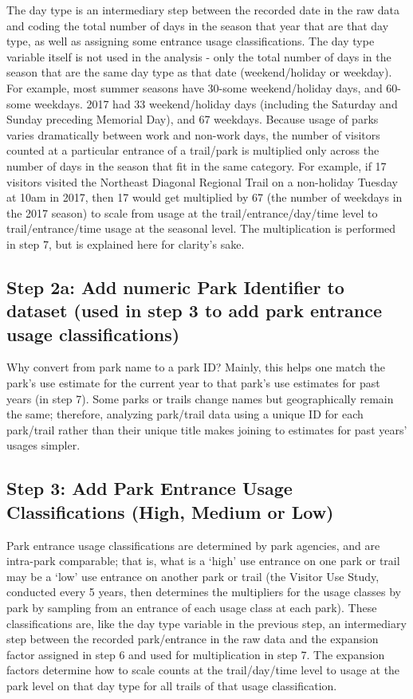 \documentclass[]{article}
\begin{document}
The day type is an intermediary step between the recorded date in the
raw data and coding the total number of days in the season that year
that are that day type, as well as assigning some entrance usage
classifications. The day type variable itself is not used in the
analysis - only the total number of days in the season that are the same
day type as that date (weekend/holiday or weekday). For example, most
summer seasons have 30-some weekend/holiday days, and 60-some weekdays.
2017 had 33 weekend/holiday days (including the Saturday and Sunday
preceding Memorial Day), and 67 weekdays. Because usage of parks varies
dramatically between work and non-work days, the number of visitors
counted at a particular entrance of a trail/park is multiplied only
across the number of days in the season that fit in the same category.
For example, if 17 visitors visited the Northeast Diagonal Regional
Trail on a non-holiday Tuesday at 10am in 2017, then 17 would get
multiplied by 67 (the number of weekdays in the 2017 season) to scale
from usage at the trail/entrance/day/time level to trail/entrance/time
usage at the seasonal level. The multiplication is performed in step 7,
but is explained here for clarity's sake.

\subsection{Step 2a: Add numeric Park Identifier to dataset (used in
step 3 to add park entrance usage
classifications)}\label{step-2a-add-numeric-park-identifier-to-dataset-used-in-step-3-to-add-park-entrance-usage-classifications}

Why convert from park name to a park ID? Mainly, this helps one match
the park's use estimate for the current year to that park's use
estimates for past years (in step 7). Some parks or trails change names
but geographically remain the same; therefore, analyzing park/trail data
using a unique ID for each park/trail rather than their unique title
makes joining to estimates for past years' usages simpler.

\subsection{Step 3: Add Park Entrance Usage Classifications (High,
Medium or
Low)}\label{step-3-add-park-entrance-usage-classifications-high-medium-or-low}

Park entrance usage classifications are determined by park agencies, and
are intra-park comparable; that is, what is a `high' use entrance on one
park or trail may be a `low' use entrance on another park or trail (the
Visitor Use Study, conducted every 5 years, then determines the
multipliers for the usage classes by park by sampling from an entrance
of each usage class at each park). These classifications are, like the
day type variable in the previous step, an intermediary step between the
recorded park/entrance in the raw data and the expansion factor assigned
in step 6 and used for multiplication in step 7. The expansion factors
determine how to scale counts at the trail/day/time level to usage at
the park level on that day type for all trails of that usage
classification.
\end{document}
